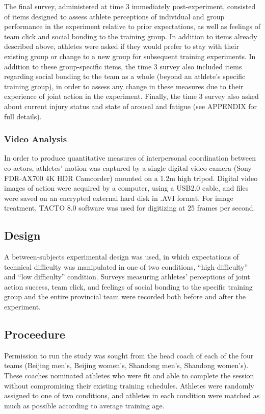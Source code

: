 \documentclass[english]{article}\usepackage[]{graphicx}\usepackage[]{color}
\begin{document}
The final survey, administered at time 3 immediately post-experiment, consisted of items designed to assess athlete perceptions of individual and group performance in the experiment relative to prior expectations, as well as feelings of team click and social bonding to the training group. In addition to items already described above, athletes were asked if they would prefer to stay with their existing group or change to a new group for subsequent training experiments.  In addition to these group-specific items, the time 3 survey also included items regarding social bonding to the team as a whole (beyond an athlete's specific training group), in order to assess any change in these measures due to their experience of joint action in the experiment.  Finally, the time 3 survey also asked about current injury status and state of arousal and fatigue (see APPENDIX for full details).

\subsubsection{Video Analysis}
In order to produce quantitative measures of interpersonal coordination between co-actors, athletes’ motion was captured by a single digital video camera (Sony FDR-AX700 4K HDR Camcorder) mounted on a 1.2m high tripod. Digital video images of action were acquired by a computer, using a USB2.0 cable, and files were saved on an encrypted external hard disk in .AVI format. For image treatment, TACTO 8.0 software was used for digitizing at 25 frames per second.

\subsection{Design}
A between-subjects experimental design was used, in which expectations of technical difficulty was manipulated in one of two conditions, ``high difficulty'' and ``low difficulty'' condition.  Surveys measuring athletes' perceptions of joint action success, team click, and feelings of social bonding to the specific training group and the entire provincial team were recorded both before and after the experiment.


\subsection{Proceedure}
Permission to run the study was sought from the head coach of each of the four teams (Beijing men's, Beijing women's, Shandong men's, Shandong women's).  These coaches nominated athletes who were fit and able to complete the session without compromising their existing training schedules.  Athletes were randomly assigned to one of two conditions, and athletes in each condition were matched as much as possible according to average training age.
\end{document}
